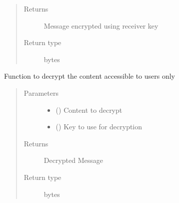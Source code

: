 \documentclass[letterpaper,10pt,english]{sphinxmanual}
\begin{document}
\begin{fulllineitems}
\begin{fulllineitems}
\begin{quote}
\begin{description}
\begin{itemize}
\end{itemize}

\item[{Returns}] \leavevmode
Message encrypted using receiver key

\item[{Return type}] \leavevmode
bytes

\end{description}\end{quote}

\end{fulllineitems}


\begin{fulllineitems}
\label{\detokenize{Message:Message.Message._decrypt}}
Function to decrypt the content accessible to users only
\begin{quote}\begin{description}
\item[{Parameters}] \leavevmode\begin{itemize}
\item {} 
 () \textendash{} Content to decrypt

\item {} 
 () \textendash{} Key to use for decryption

\end{itemize}

\item[{Returns}] \leavevmode
Decrypted Message

\item[{Return type}] \leavevmode
bytes

\end{description}\end{quote}

\end{fulllineitems}



\end{fulllineitems}
\end{document}

